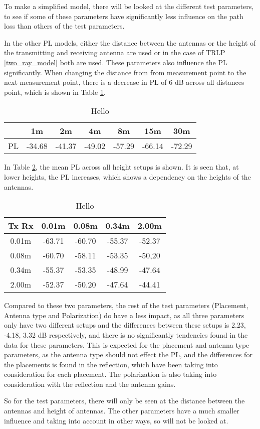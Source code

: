 To make a simplified model, there will be looked at the different test parameters, to see if some of these parameters have significantly less influence on the path loss than others of the test parameters.

In the other PL models, either the distance between the antennas or the height of the transmitting and receiving antenna are used or in the case of TRLP \eqref{two_ray_model} both are used. These parameters also influence the PL significantly. When changing the distance from from measurement point to the next measurement point, there is a decrease in PL of 6 dB across all distances point, which is shown in Table \ref{App1}.

\begin{table}[!htbp]
\centering
\begin{tabular}{|c|c|c|c|c|c|c|}
\hline
   & 1m & 2m & 4m & 8m & 15m & 30m\\
\hline
PL & -34.68 & -41.37 & -49.02 & -57.29 & -66.14 & -72.29 \\
\hline
\end{tabular}
\label{App1}
\caption{Hello}
\end{table}



In Table \ref{App2}, the mean PL across all height setups is shown. It is seen that, at lower heights, the PL increases, which shows a dependency on the heights of the antennas.

\begin{table}[!htbp]
\centering
\begin{tabular}{|c|c|c|c|c|}
\hline
Tx Rx & 0.01m & 0.08m & 0.34m & 2.00m \\
\hline
0.01m & -63.71 & -60.70 & -55.37 & -52.37\\
\hline
0.08m & -60.70 & -58.11 & -53.35 & -50,20\\
\hline
0.34m & -55.37 & -53.35 & -48.99 & -47.64\\
\hline
2.00m & -52.37 & -50.20 & -47.64 & -44.41\\
\hline
\end{tabular}
\caption{Hello}
\label{App2}
\end{table}

Compared to these two parameters, the rest of the test parameters (Placement, Antenna type and Polarization) do have a less impact, as all three parameters only have two different setups and the differences between these setups is 2.23, -4.18, 3.32 dB respectively, and there is no significantly tendencies found in the data for these parameters. This is expected for the placement and antenna type parameters, as the antenna type should not effect the PL, and the differences for the placements is found in the reflection, which have been taking into consideration for each placement. The polarization is also taking into consideration with the reflection and the antenna gains.

So for the test parameters, there will only be seen at the distance between the antennas and height of antennas. The other parameters have a much smaller influence and taking into account in other ways, so will not be looked at.
